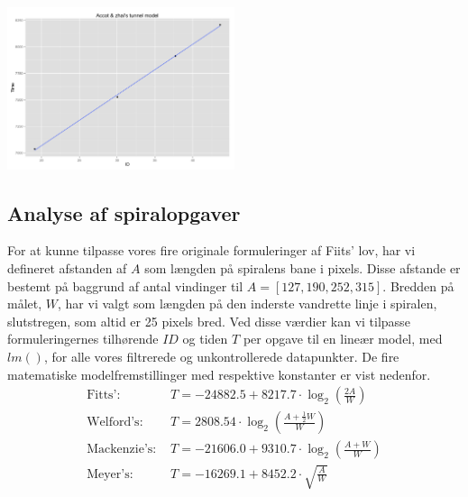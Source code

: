 \begin{minipage}{\linewidth}
	\begin{minipage}[t]{\linewidth}
		\centering
		\includegraphics[width=0.5\textwidth]{images/plots/plot_model_tunnel_accot}
		\label{fig:accot_tunnel_line}
	\end{minipage}
\end{minipage}

\newpage
{}
\subsection*{Analyse af spiralopgaver}
For at kunne tilpasse vores fire originale formuleringer af Fiits' lov, har vi defineret afstanden af $A$ som længden på spiralens bane i pixels. Disse afstande er bestemt på baggrund af antal vindinger til $A = [127,190,252,315]$. Bredden på målet, $W$, har vi valgt som længden på den inderste vandrette linje i spiralen, slutstregen, som altid er 25 pixels bred. Ved disse værdier kan vi tilpasse formuleringernes tilhørende $ID$ og tiden $T$ per opgave til en lineær model, med $lm()$, for alle vores filtrerede og unkontrollerede datapunkter. De fire matematiske modelfremstillinger med respektive konstanter er vist nedenfor.
\begin{align*}
\text{Fitts': } &T = -24882.5+ 8217.7 \cdot \log_2\left(\frac{2A}{W}\right)\\
\text{Welford's: } &T =  2808.54\cdot \log_2\left(\frac{A+\frac{1}{2}W}{W}\right)\\
\text{Mackenzie's: } &T = -21606.0 + 9310.7\cdot \log_2\left(\frac{A+W}{W}\right)\\
\text{Meyer's: } &T = -16269.1 + 8452.2 \cdot \sqrt{\frac{A}{W}}
\end{align*}

